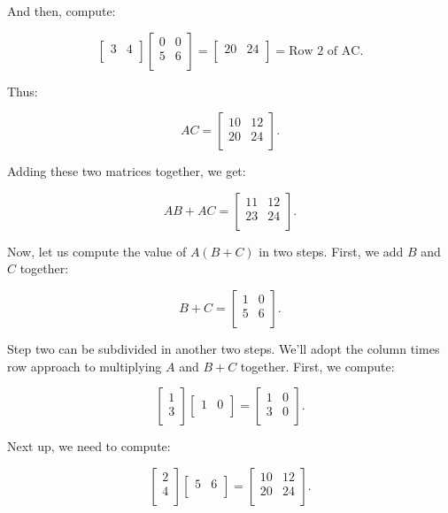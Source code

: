 \documentclass{article}
\begin{document}
And then, compute:

\[
\begin{bmatrix}
3 & 4\\
\end{bmatrix}
\begin{bmatrix}
0 & 0\\
5 & 6\\
\end{bmatrix}
=
\begin{bmatrix}
20 & 24\\
\end{bmatrix}
= \text{Row 2 of AC}.
\]

Thus:

\[
AC = \begin{bmatrix}
10 & 12\\
20 & 24\\
\end{bmatrix}.
\]

Adding these two matrices together, we get:

\[
AB + AC = \begin{bmatrix}
11 & 12\\
23 & 24\\
\end{bmatrix}.
\]

Now, let us compute the value of $A(B + C)$ in two steps. First, we add $B$ and $C$ together:

\[
B + C = \begin{bmatrix}
1 & 0\\
5 & 6\\
\end{bmatrix}.
\]

Step two can be subdivided in another two steps. We'll adopt the column times row approach to multiplying $A$ and $B + C$ together. First, we compute:

\[
\begin{bmatrix}
1\\
3\\
\end{bmatrix}
\begin{bmatrix}
1 & 0\\
\end{bmatrix}
=
\begin{bmatrix}
1 & 0\\
3 & 0\\
\end{bmatrix}.
\]

Next up, we need to compute:

\[
\begin{bmatrix}
2\\
4\\
\end{bmatrix}
\begin{bmatrix}
5 & 6\\
\end{bmatrix}
=
\begin{bmatrix}
10 & 12\\
20 & 24\\
\end{bmatrix}.
\]
\end{document}
